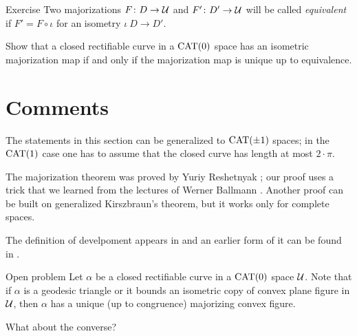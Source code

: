 \begin{thm}{Exercise}\label{ex:bishop}
Two majorizations $F\colon D\to \mathcal{U}$ and $F'\colon D'\to \mathcal{U}$ will be called \emph{equivalent} if $F'=F\circ\iota$ for an isometry $\iota\:D\to D'$.

Show that a closed rectifiable curve in a $\mathrm{CAT}(0)$ space has an isometric majorization map if and only if the majorization map is unique up to equivalence.
\end{thm}


\section{Comments}

The statements in this section can be generalized to $\mathrm{CAT}(\pm1)$ spaces;
in the $\mathrm{CAT}(1)$ case one has to assume that the closed curve has length at most $2\cdot\pi$.

The majorization theorem was proved by Yuriy Reshetnyak \cite{reshetnyak:major};
our proof uses a trick that we learned from the lectures of Werner Ballmann \cite{ballmann:lectures}.
Another proof can be built on generalized Kirszbraun's theorem, but it works only for complete spaces.

The definition of develpoment appears in \cite{alexandrov:devel}
and an earlier form of it can be found in \cite{liberman}.

\begin{thm}{Open problem}
Let $\alpha$ be a closed rectifiable curve in a $\mathrm{CAT}(0)$ space $\mathcal{U}$.
Note that if $\alpha$ is a geodesic triangle or it bounds an isometric copy of convex plane figure in $\mathcal{U}$, then $\alpha$ has a unique (up to congruence) majorizing convex figure.

What about the converse?
\end{thm}
